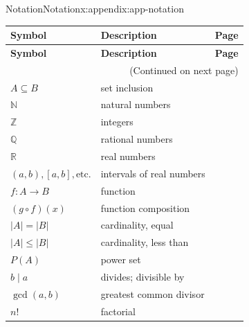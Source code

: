 \documentclass[oneside,10pt,]{book}
\numberwithin{equation}{section}
\begin{document}
%
%
%
\typeout{************************************************}
\typeout{************************************************}
%
%
\appendix
%
\begin{appendixptx}{Notation}{}{Notation}{}{}{x:appendix:app-notation}
\begin{longtable}[l]{lp{}r}
\addtocounter{table}{-1}
\textbf{Symbol}&\textbf{Description}&\textbf{Page}\\[1em]
\endfirsthead
\textbf{Symbol}&\textbf{Description}&\textbf{Page}\\[1em]
\endhead
\multicolumn{3}{r}{(Continued on next page)}\\
\endfoot
\endlastfoot
\(A \subseteq B\)&set inclusion&\pageref{g:notation:id235689}\\
\(\mathbb{N}\)&natural numbers&\pageref{g:notation:id322580}\\
\(\mathbb{Z}\)&integers&\pageref{g:notation:id322569}\\
\(\mathbb{Q}\)&rational numbers&\pageref{g:notation:id322592}\\
\(\mathbb{R}\)&real numbers&\pageref{g:notation:id322616}\\
\((a,b), [a,b], \text{etc.}\)&intervals of real numbers&\pageref{g:notation:id322611}\\
\(f: A \rightarrow B\)&function&\pageref{g:notation:id322729}\\
\((g \circ f)(x)\)&function composition&\pageref{g:notation:id322963}\\
\(|A| = |B|\)&cardinality, equal&\pageref{g:notation:id323012}\\
\(|A| \leq |B|\)&cardinality, less than&\pageref{g:notation:id323008}\\
\(P(A)\)&power set&\pageref{g:notation:id323197}\\
\(b \mid a\)&divides; divisible by&\pageref{g:notation:id322041}\\
\(\gcd(a,b)\)&greatest common divisor&\pageref{g:notation:id322505}\\
\(n!\)&factorial&\pageref{x:notation:not-factorial}\\
\end{longtable}
\end{appendixptx}
%
%
\typeout{************************************************}
\typeout{************************************************}
%
\end{document}
